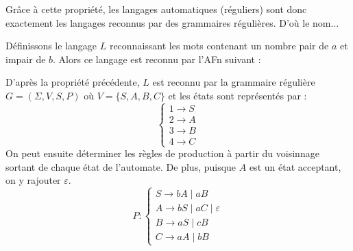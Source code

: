 \begin{remark}
    Grâce à cette propriété, les langages automatiques (réguliers) sont donc exactement les langages reconnus par des grammaires régulières. 
    D'où le nom...
\end{remark}

\begin{example}
    Définissons le langage $L$ reconnaissant les mots contenant un nombre pair de $a$ et impair de $b$. 
    Alors ce langage est reconnu par l'AFn suivant : 
    \begin{center}
    \end{center}
    
    D'après la propriété précédente, $L$ est reconnu par la grammaire régulière $G = (\Sigma, V, S, P)$
    où $V = \{S,A,B,C\}$ et les états sont représentés par :
        \[ 
            \begin{cases}
                1 \longrightarrow S \\ 
                2 \longrightarrow A \\ 
                3 \longrightarrow B \\ 
                4 \longrightarrow C
            \end{cases} \] 
    On peut ensuite déterminer les règles de production à partir du voisinnage sortant 
    de chaque état de l'automate. De plus, puisque $A$ est un état acceptant, on y rajouter $\varepsilon$. 
    \[ P : 
            \begin{cases}
                S \longrightarrow bA \; | \; aB \\ 
                A \longrightarrow bS \; | \; aC \; | \; \varepsilon \\ 
                B \longrightarrow aS \; | \; cB \\ 
                C \longrightarrow aA \; | \; bB 
            \end{cases} \] 
\end{example}


